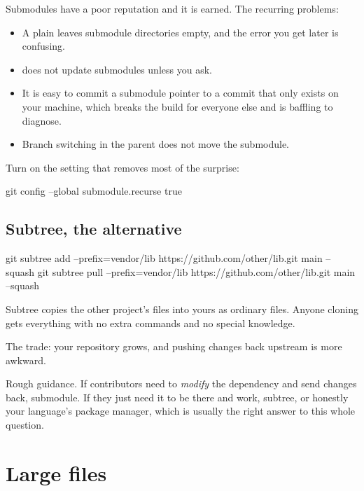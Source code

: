 \documentclass[11pt]{article}
\begin{document}
\begin{trap}
Submodules have a poor reputation and it is earned. The recurring problems:

\begin{itemize}
  \item A plain  leaves submodule directories empty, and the error you
    get later is confusing.
  \item {} does not update submodules unless you ask.
  \item It is easy to commit a submodule pointer to a commit that only exists on
    your machine, which breaks the build for everyone else and is baffling to
    diagnose.
  \item Branch switching in the parent does not move the submodule.
\end{itemize}

Turn on the setting that removes most of the surprise:

\begin{shell}
git config --global submodule.recurse true
\end{shell}
\end{trap}

\subsection{Subtree, the alternative}

\begin{shell}
git subtree add --prefix=vendor/lib https://github.com/other/lib.git main --squash
git subtree pull --prefix=vendor/lib https://github.com/other/lib.git main --squash
\end{shell}

Subtree copies the other project's files into yours as ordinary files. Anyone
cloning gets everything with no extra commands and no special knowledge.

The trade: your repository grows, and pushing changes back upstream is more awkward.

\begin{note}
Rough guidance. If contributors need to \emph{modify} the dependency and send
changes back, submodule. If they just need it to be there and work, subtree, or
honestly your language's package manager, which is usually the right answer to this
whole question.
\end{note}

\section{Large files}
\end{document}
